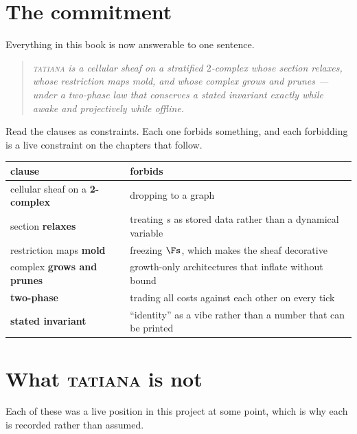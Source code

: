\section{The commitment}

Everything in this book is now answerable to one sentence.

\begin{quote}\itshape
\textsc{tatiana} is a cellular sheaf on a stratified $2$-complex whose
section relaxes, whose restriction maps mold, and whose complex grows and
prunes --- under a two-phase law that conserves a stated invariant exactly
while awake and projectively while offline.
\end{quote}

Read the clauses as constraints. Each one forbids something, and each
forbidding is a live constraint on the chapters that follow.

\begin{center}
\begin{tabular}{p{}p{}}
\toprule
\textbf{clause} & \textbf{forbids} \\
\midrule
cellular sheaf on a \textbf{2-complex} & dropping to a graph \\
section \textbf{relaxes} & treating $s$ as stored data rather than a dynamical variable \\
restriction maps \textbf{mold} & freezing $\Fs$, which makes the sheaf decorative \\
complex \textbf{grows and prunes} & growth-only architectures that inflate without bound \\
\textbf{two-phase} & trading all costs against each other on every tick \\
\textbf{stated invariant} & ``identity'' as a vibe rather than a number that can be printed \\
\bottomrule
\end{tabular}
\end{center}

\section{What \textsc{tatiana} is not}\label{sec:isnot}

Each of these was a live position in this project at some point, which is why
each is recorded rather than assumed.

